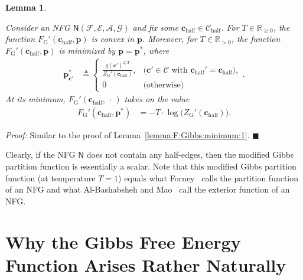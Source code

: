 \documentclass[journal, twocolumn]{IEEEtran}
\renewcommand{\mathbf}[1]{{\bm{#1}}}
\renewcommand{\geq}{\geqslant}
\newcommand{\Rp}{\mathbb{R}_{\geq 0}}
\newcommand{\Rpp}{\mathbb{R}_{>0}}
\newcommand{\vect}[1]{\mathbf{#1}}
\newcommand{\code}[1]{\mathcal{#1}}
\newcommand{\set}[1]{\mathcal{#1}}
\newcommand{\graph}[1]{\mathsf{#1}}
\newcommand{\defeq}{\triangleq}
\newcommand{\codeCedgehalf}{\code{C}_{\mathrm{half}}}
\newcommand{\setA}{\set{A}}
\newcommand{\setC}{\set{C}}
\newcommand{\setE}{\set{E}}
\newcommand{\setF}{\set{F}}
\newcommand{\setG}{\set{G}}
\newcommand{\vc}{\vect{c}}
\newcommand{\vchalf}{\vc_{\mathrm{half}}}
\newcommand{\vp}{\vect{p}}
\newcommand{\graphN}{\graph{N}}
\newcommand{\?}{\mathrm{?}}
\newcommand{\qedblack}{\hspace*{\fill}%
  $\blacksquare$\smallskip}
\newcommand{\FGibbs}{F_{\mathrm{G}}}
\newcommand{\ZGibbs}{Z_{\mathrm{G}}}
\newtheorem{Lemma}{Lemma}
\newenvironment{Proof}%
  {\noindent \emph{Proof:}}{\qedblack}
\begin{document}
\begin{Lemma}
  \label{lemma:F:Gibbs:minimum:2}

  Consider an NFG $\graphN(\setF,\setE, \setA, \setG)$ and fix some $\vchalf
  \in \codeCedgehalf$. For $T \in \Rp$, the function $\FGibbs'(\vchalf, \vp)$
  is convex in $\vp$. Moreover, for $T \in \Rpp$, the function
  $\FGibbs'(\vchalf, \vp)$ is minimized by $\vp = \vp^{*}$, where
  \begin{align*}
    \vp^{*}_{\vc'}
      &\defeq
         \begin{cases}
           \frac{g(\vc')^{1/T}}
                {\ZGibbs'(\vchalf)},
             & \text{($\vc' \in \setC$ with $\vchalf' = \vchalf$)}, \\
           0 & \text{(otherwise)}
         \end{cases}.
  \end{align*}
  At its minimum, $\FGibbs'(\vchalf, \, \cdot \,)$ takes on the value
  \begin{align*}
    \FGibbs'(\vchalf, \vp^{*})
      &= -
         T
         \cdot
         \log
           \big(
             \ZGibbs'(\vchalf)
           \big).
  \end{align*}
\end{Lemma}



\begin{Proof}
  Similar to the proof of Lemma~\ref{lemma:F:Gibbs:minimum:1}.
\end{Proof}


Clearly, if the NFG $\graphN$ does not contain any half-edges, then the
modified Gibbs partition function is essentially a scalar. Note that this
modified Gibbs partition function (at temperature $T = 1$) equals what
Forney~\cite{Forney:11:1} calls the partition function of an NFG and what
Al-Bashabsheh and Mao~\cite{AlBashabsheh:Mao:11:1} call the exterior function
of an NFG.






\section{Why the Gibbs Free Energy Function Arises Rather Naturally}
\label{sec:Gibbs:free:energy:arises:naturally:1}
\end{document}
